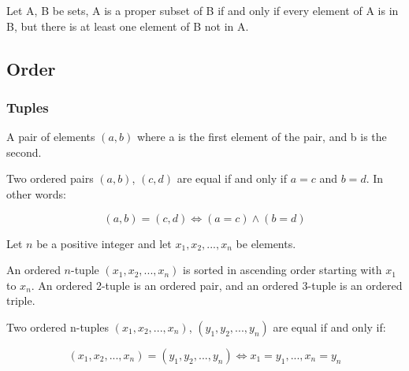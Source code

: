 \documentclass[11pt]{article}
\begin{document}
\begin{definition}\label{def:proper-subset-txt}
Let A, B be sets, A is a proper subset of B if and only if every element of A is in B, but there
is at least one element of B not in A.
\end{definition}

\subsection{Order}

\subsubsection{Tuples}

\begin{definition}\label{def:ordered-pair}
    A pair of elements $(a, b)$ where a is the first
    element of the pair, and b is the second. 
\end{definition}

\begin{definition}\label{def:ordered-pair-eq}
    Two ordered pairs $(a,b)$, $(c,d)$ are equal if and only if
    $a = c$ and $b = d$. In other words:

    \begin{equation}
        (a,b) = (c,d) \iff (a = c) \land (b = d)
    \end{equation}
\end{definition}

\begin{definition}[Tuples]\label{def:tuple}
    Let $n$ be a positive integer and let $x_1, x_2, ... , x_n$ be elements.

    An ordered $n$-tuple $(x_1, x_2, ... , x_n)$ is sorted in ascending order
    starting with $x_1$ to $x_n$. An ordered 2-tuple is an ordered pair,
    and an ordered 3-tuple is an ordered triple.
\end{definition}

\begin{definition}\label{def:tuple-eq}
    Two ordered n-tuples $(x_1, x_2, ..., x_n)$, $(y_1, y_2, ..., y_n)$
    are equal if and only if:

    \begin{equation}
        (x_1, x_2, ..., x_n) = (y_1, y_2, ..., y_n) \iff x_1 = y_1, ..., x_n = y_n
    \end{equation}
\end{definition}
\end{document}
